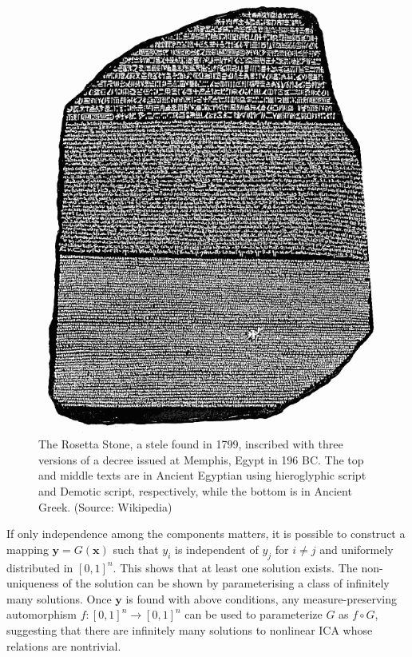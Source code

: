 \documentclass[letterpaper]{article}
\theoremstyle{definition}
\begin{document}
\begin{figure}[t!]
    \centering
    \includegraphics[scale=0.3]{img/Rosetta_Stone.png}
    \caption{The Rosetta Stone, a stele found in 1799, inscribed with three versions of a decree issued at Memphis, Egypt in 196 BC. The top and middle texts are in Ancient Egyptian using hieroglyphic script and Demotic script, respectively, while the bottom is in Ancient Greek. (Source: Wikipedia)}
    \label{fig:rosetta}
\end{figure}
If only independence among the components matters, it is possible to construct a mapping $\bm{y}=G(\bm{x})$ such that $y_i$ is independent of $y_j$ for $i\neq j$ and uniformely distributed in $[0,1]^n$. This shows that at least one solution exists. The non-uniqueness of the solution can be shown by parameterising a class of infinitely many solutions. Once $\bm{y}$ is found with above conditions, any measure-preserving automorphism $f:[0,1]^n\to[0,1]^n$ can be used to parameterize $G$ as $f\circ G$, suggesting that there are infinitely many solutions to nonlinear ICA whose relations are nontrivial.
\end{document}
